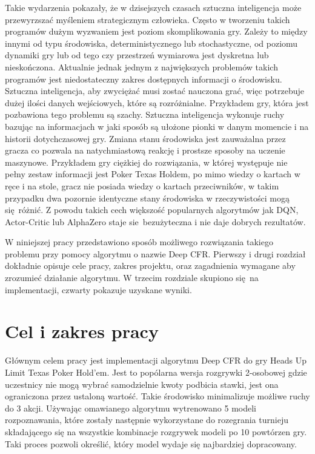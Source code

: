 \documentclass[12pt,oneside,a4paper]{report}
\begin{document}
Takie wydarzenia pokazały, że w dzisejszych czasach sztuczna inteligencja może przewyrzszać
myśleniem strategicznym człowieka.
Często w tworzeniu takich programów dużym wyzwaniem jest poziom skomplikowania gry. 
Zależy to między innymi od typu środowiska, deterministycznego lub stochastyczne, 
od poziomu dynamiki gry lub od tego czy przestrzeń wymiarowa jest
dyskretna lub nieskończona.
Aktualnie jednak jednym z największych problemów takich programów jest niedostateczny
zakres dostępnych informacji o środowisku. Sztuczna inteligencja, aby zwyciężać
musi zostać nauczona grać, więc potrzebuje dużej ilości danych wejściowych, które są 
rozróżnialne. Przykładem gry, która jest pozbawiona tego problemu są szachy. 
Sztuczna inteligencja wykonuje ruchy bazując na informacjach w jaki sposób są ułożone pionki
w danym momencie i na historii dotychczasowej gry. Zmiana stanu środowiska jest
zauważalna przez gracza co pozwala na natychmiastową reakcję i prostsze sposoby na uczenie
maszynowe. Przykładem gry ciężkiej do rozwiązania, w której występuje nie pełny zestaw informacji 
jest Poker Texas Holdem, po mimo wiedzy o kartach w ręce i na stole, gracz nie posiada wiedzy o 
kartach przeciwników, w takim przypadku dwa pozornie identyczne stany środowiska w
rzeczywistości mogą się różnić. Z powodu takich cech większość popularnych algorytmów jak 
DQN, Actor-Critic lub AlphaZero staje sie bezużyteczna i nie daje dobrych rezultatów.

W niniejszej pracy przedstawiono sposób możliwego rozwiązania takiego problemu przy pomocy 
algorytmu o nazwie Deep CFR. Pierwszy i drugi rozdział dokładnie opisuje cele pracy, zakres 
projektu, 
oraz zagadnienia wymagane aby zrozumieć działanie algorytmu. W trzecim rozdziale skupiono się na
implementacji, czwarty pokazuje uzyskane wyniki.


\section{Cel i zakres pracy}

Głównym celem pracy jest implementacji algorytmu Deep CFR do gry Heads Up Limit Texas 
Poker Hold'em. Jest to popólarna wersja rozgrywki 2-osobowej gdzie uczestnicy nie mogą wybrać
samodzielnie kwoty podbicia stawki, jest ona ograniczona przez ustaloną wartość. Takie środowisko
minimalizuje możliwe ruchy do 3 akcji. Używając omawianego algorytmu
wytrenowano 5 modeli rozpoznawania, które zostały następnie wykorzystane do rozegrania
turnieju składającego się na wszystkie kombinacje rozgrywek modeli po
10 powtórzen gry. Taki proces pozwoli określić, który model wydaje się najbardziej dopracowany. 
\end{document}
